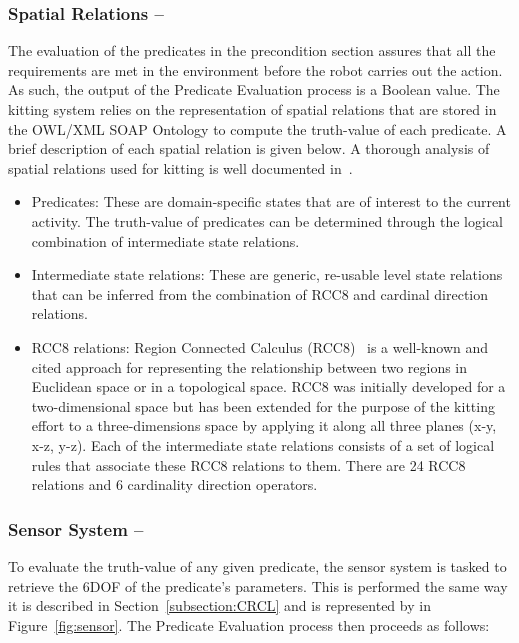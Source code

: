 \subsubsection{Spatial Relations -- }
 The evaluation of the predicates in the precondition section assures that all the requirements are met in the environment before the robot carries out the action. As such, the output of the \textsf{Predicate Evaluation} process is a Boolean value. The kitting system relies on the representation of spatial relations that are stored in the \textsf{OWL/XML SOAP Ontology} to compute the truth-value of each predicate. A brief description of each spatial relation is given below. A thorough analysis of spatial relations used for kitting is well documented in~\cite{SCHLENOFF.RAS.2013}.
\begin{itemize}
 \item Predicates: These are domain-specific states that are of interest to the current activity. The truth-value of predicates can be determined through the logical combination of intermediate state relations.
\item Intermediate state relations: These are generic, re-usable level state relations that can be inferred from the combination of RCC8 and cardinal direction relations.
\item RCC8 relations: Region Connected Calculus (RCC8)~\cite{Wolter2000} is a well-known and cited approach for representing the relationship between two regions in Euclidean space or in a topological space. RCC8 was initially developed for a two-dimensional space but has been extended for the purpose of the kitting effort to a three-dimensions space by applying it along all three planes (x-y, x-z, y-z). Each of the intermediate state relations consists of a set of logical rules that associate these RCC8 relations to them. There are 24 RCC8 relations and 6 cardinality direction operators.
\end{itemize}

\subsubsection{Sensor System -- }
To evaluate the truth-value of any given predicate, the sensor system is tasked to retrieve the 6DOF of the predicate's parameters. This is performed the same way it is described in Section~\ref{subsection:CRCL} and is represented by  in Figure~\ref{fig:sensor}. The \textsf{Predicate Evaluation} process then proceeds as follows:

